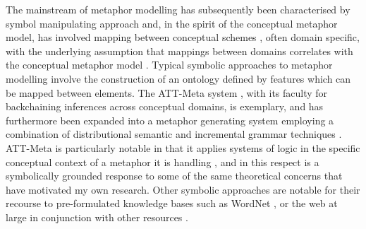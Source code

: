 The mainstream of metaphor modelling has subsequently been characterised by symbol manipulating approach and, in the spirit of the conceptual metaphor model, has  involved mapping between conceptual schemes \citep{Indurkhya1997}, often domain specific, with the underlying assumption that mappings between domains correlates with the conceptual metaphor model \citep{Narayanan1999}.  Typical symbolic approaches to metaphor modelling involve the construction of an ontology defined by features which can be mapped between elements.  The ATT-Meta system \citep{LeeEA2001}, with its faculty for backchaining inferences across conceptual domains, is exemplary, and has furthermore been expanded into a metaphor generating system employing a combination of distributional semantic and incremental grammar techniques \citep{GargettEA2013}.  ATT-Meta is particularly notable in that it applies systems of logic in the specific conceptual context of a metaphor it is handling \citep{BarndenEA1999}, and in this respect is a symbolically grounded response to some of the same theoretical concerns that have motivated my own research.  Other symbolic approaches are notable for their recourse to pre-formulated knowledge bases such as WordNet \citep{VealeEA2015}, or the web at large in conjunction with other resources \citep{VealeEA2007}.

